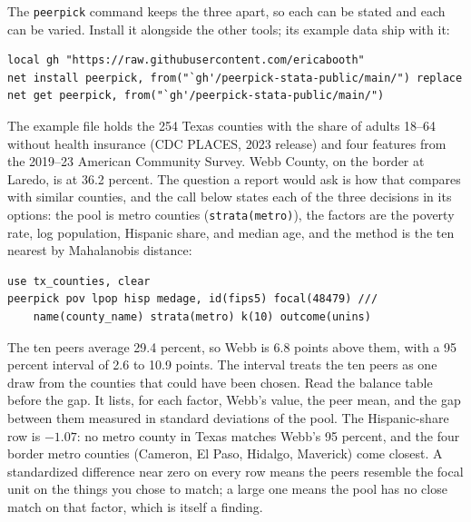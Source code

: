 The \texttt{peerpick} command keeps the three apart, so each can be stated and each can be varied. Install it alongside the other tools; its example data ship with it:
\par
{\footnotesize
\begin{verbatim}
local gh "https://raw.githubusercontent.com/ericabooth"
net install peerpick, from("`gh'/peerpick-stata-public/main/") replace
net get peerpick, from("`gh'/peerpick-stata-public/main/")
\end{verbatim}
}
The example file holds the 254 Texas counties with the share of adults 18--64 without health insurance (CDC PLACES, 2023 release) and four features from the 2019--23 American Community Survey. Webb County, on the border at Laredo, is at 36.2 percent. The question a report would ask is how that compares with similar counties, and the call below states each of the three decisions in its options: the pool is metro counties (\texttt{strata(metro)}), the factors are the poverty rate, log population, Hispanic share, and median age, and the method is the ten nearest by Mahalanobis distance:
\par
{\footnotesize
\begin{verbatim}
use tx_counties, clear
peerpick pov lpop hisp medage, id(fips5) focal(48479) ///
    name(county_name) strata(metro) k(10) outcome(unins)
\end{verbatim}
}
The ten peers average 29.4 percent, so Webb is 6.8 points above them, with a 95 percent interval of 2.6 to 10.9 points. The interval treats the ten peers as one draw from the counties that could have been chosen. Read the balance table before the gap. It lists, for each factor, Webb's value, the peer mean, and the gap between them measured in standard deviations of the pool. The Hispanic-share row is $-1.07$: no metro county in Texas matches Webb's 95 percent, and the four border metro counties (Cameron, El Paso, Hidalgo, Maverick) come closest. A standardized difference near zero on every row means the peers resemble the focal unit on the things you chose to match; a large one means the pool has no close match on that factor, which is itself a finding.


